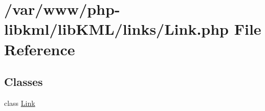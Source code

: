 \hypertarget{links_2Link_8php}{
\section{/var/www/php-\/libkml/libKML/links/Link.php File Reference}
\label{d0/d55/links_2Link_8php}
}
\subsection*{Classes}
\begin{DoxyCompactItemize}
\item 
class \hyperlink{classLink}{Link}
\end{DoxyCompactItemize}
